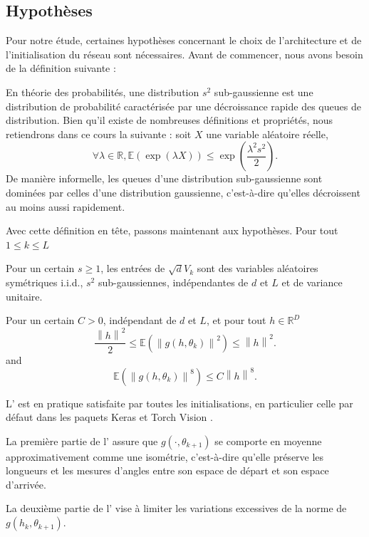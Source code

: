 \subsection*{Hypothèses}
Pour notre étude, certaines hypothèses concernant le choix de l'architecture et de l'initialisation du réseau sont nécessaires. Avant de commencer, nous avons besoin de la définition suivante :
\begin{definition}
    En théorie des probabilités, une distribution $s^2$ sub-gaussienne est une distribution de probabilité caractérisée par une décroissance rapide des queues de distribution. Bien qu'il existe de nombreuses définitions et propriétés, nous retiendrons dans ce cours la suivante : soit $X$ une variable aléatoire réelle,
    \[
        \forall \lambda \in \mathbb{R}, \mathbb{E}(\exp(\lambda X)) \leq \exp\left(\frac{\lambda^2 s^2}{2}\right).
    \]
    De manière informelle, les queues d'une distribution sub-gaussienne sont dominées par celles d'une distribution gaussienne, c'est-à-dire qu'elles décroissent au moins aussi rapidement.
\end{definition}

Avec cette définition en tête, passons maintenant aux hypothèses. Pour tout $ 1 \leq  k \leq L  $
\begin{assumption}\label{H1}
    Pour un certain $ s \geq 1 $, les entrées de  $ \sqrt{d}V_k $ sont des variables aléatoires symétriques i.i.d., $ s^2 $ sub-gaussiennes, indépendantes de $ d $ et $ L $ et de variance unitaire.
\end{assumption}
    
\begin{assumption}\label{H2}
    Pour un certain $ C > 0 $, indépendant de $ d $ et $ L $, et pour tout $ h \in \mathbb{R}^D  $ 
    \[
        \frac{\left\| h \right\| ^2}{2 } \leq  \mathbb{E}( \left\|  g(h, \theta _ k ) \right\| ^2 ) \leq \left\| h \right\| ^2
    .\]
    and
    \[
        \mathbb{E } (\left\| g(h, \theta _k)  \right\| ^8 ) \leq C \left\| h  \right\| ^8
    .\]
\end{assumption}

\begin{note}
    L' est en pratique satisfaite par toutes les initialisations, en particulier celle par défaut dans les paquets Keras \citep{chollet2015keras} et Torch Vision \citep{torchvision2016}.

    La première partie de l' assure que $g(\cdot, \theta_{k+1})$ se comporte en moyenne approximativement comme une isométrie, c'est-à-dire qu'elle préserve les longueurs et les mesures d'angles entre son espace de départ et son espace d'arrivée.

    La deuxième partie de l' vise à limiter les variations excessives de la norme de $g(h_k, \theta_{k+1})$.
\end{note}

